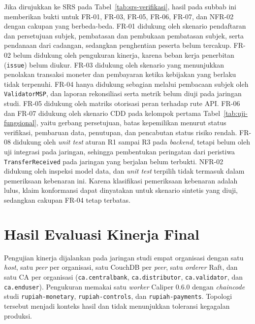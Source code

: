 Jika dirujukkan ke SRS pada Tabel~\ref{tab:srs-verifikasi}, hasil pada subbab ini
memberikan bukti untuk FR-01, FR-03, FR-05, FR-06, FR-07, dan NFR-02 dengan cakupan yang
berbeda-beda. FR-01 didukung oleh skenario pendaftaran dan persetujuan subjek, pembatasan dan pembukaan pembatasan subjek, serta pendanaan dari
cadangan, sedangkan penghentian peserta belum tercakup. FR-02
belum didukung oleh pengukuran kinerja, karena beban kerja penerbitan (\texttt{issue}) belum diukur. FR-03 didukung oleh skenario yang menunjukkan penolakan transaksi moneter dan pembayaran
ketika kebijakan yang berlaku tidak terpenuhi. FR-04 hanya didukung sebagian melalui
pembacaan subjek oleh \texttt{ValidatorMSP}, dan laporan rekonsiliasi serta metrik belum
diuji pada jaringan studi. FR-05 didukung oleh matriks otorisasi peran terhadap rute
API. FR-06 dan FR-07 didukung oleh skenario CDD pada kelompok pertama Tabel~\ref{tab:uji-fungsional}, yaitu gerbang persetujuan, batas kepemilikan menurut status verifikasi, pembaruan data, penutupan, dan pencabutan status risiko rendah. FR-08 didukung oleh \textit{unit test} aturan R1 sampai R3 pada \textit{backend}, tetapi belum oleh uji integrasi pada jaringan, sehingga pembentukan peringatan dari peristiwa \texttt{TransferReceived} pada jaringan yang berjalan belum terbukti. NFR-02 didukung oleh inspeksi model data, dan \textit{unit test} terpilih tidak termasuk dalam pemeriksaan kebenaran ini.
Karena klasifikasi pemeriksaan kebenaran adalah lulus, klaim konformansi dapat dinyatakan untuk skenario sintetis yang diuji, sedangkan cakupan FR-04 tetap terbatas.


\section{Hasil Evaluasi Kinerja Final}

Pengujian kinerja dijalankan pada jaringan studi empat organisasi dengan satu
\textit{host}, satu \textit{peer} per organisasi, satu CouchDB per \textit{peer},
satu \textit{orderer} Raft, dan satu CA per organisasi (\texttt{ca.centralbank}, \texttt{ca.distributor}, \texttt{ca.validator}, dan \texttt{ca.enduser}). Pengukuran memakai satu \textit{worker}
Caliper 0.6.0 dengan \textit{chaincode} studi \texttt{rupiah-monetary},
\texttt{rupiah-controls}, dan \texttt{rupiah-payments}. Topologi tersebut menjadi
konteks hasil dan tidak menunjukkan toleransi kegagalan produksi.

